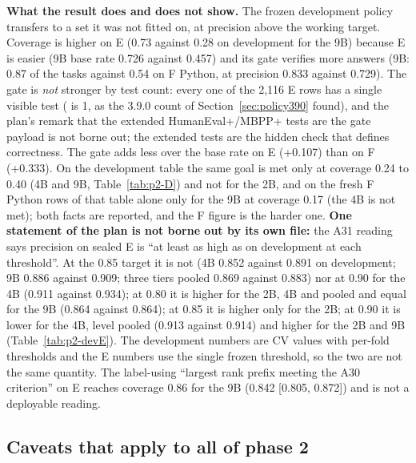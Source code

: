 \documentclass[11pt,a4paper]{article}
\newcommand{\code}[1]{\texttt{\detokenize{#1}}}
\begin{document}
\textbf{What the result does and does not show.} The frozen development policy transfers to a set it was not fitted on, at precision above the working target. Coverage is higher on E (0.73 against 0.28 on development for the 9B) because E is easier (9B base rate 0.726 against 0.457) and its gate verifies more answers (9B: 0.87 of the tasks against 0.54 on F Python, at precision 0.833 against 0.729). The gate is \emph{not} stronger by test count: every one of the 2,116 E rows has a single visible test (\code{n_visible_tests} is 1, as the 3.9.0 count of Section~\ref{sec:policy390} found), and the plan's remark that the extended HumanEval+/MBPP+ tests are the gate payload is not borne out; the extended tests are the hidden check that defines correctness. The gate adds less over the base rate on E (+0.107) than on F (+0.333). On the development table the same goal is met only at coverage 0.24 to 0.40 (4B and 9B, Table~\ref{tab:p2-D}) and not for the 2B, and on the fresh F Python rows of that table alone only for the 9B at coverage 0.17 (the 4B is not met); both facts are reported, and the F figure is the harder one. \textbf{One statement of the plan is not borne out by its own file:} the A31 reading says precision on sealed E is ``at least as high as on development at each threshold''. At the 0.85 target it is not (4B 0.852 against 0.891 on development; 9B 0.886 against 0.909; three tiers pooled 0.869 against 0.883) nor at 0.90 for the 4B (0.911 against 0.934); at 0.80 it is higher for the 2B, 4B and pooled and equal for the 9B (0.864 against 0.864); at 0.85 it is higher only for the 2B; at 0.90 it is lower for the 4B, level pooled (0.913 against 0.914) and higher for the 2B and 9B (Table~\ref{tab:p2-devE}). The development numbers are CV values with per-fold thresholds and the E numbers use the single frozen threshold, so the two are not the same quantity. The label-using ``largest rank prefix meeting the A30 criterion'' on E reaches coverage 0.86 for the 9B (0.842 [0.805, 0.872]) and is not a deployable reading.

\subsection{Caveats that apply to all of phase 2}\label{sec:p2-caveats}
\end{document}
